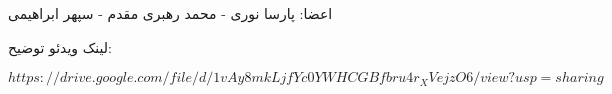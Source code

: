 \documentclass[12pt,a4paper]{article}
\begin{document}

اعضا: پارسا نوری - محمد رهبری مقدم - سپهر ابراهیمی


لینک ویدئو توضیح:
\begin{latin}
$https://drive.google.com/file/d/1vAy8mkLjfYc0YWHCGBfbru4r_XVejzO6/view?usp=sharing$
\end{latin}











\newpage




   
\end{document}
